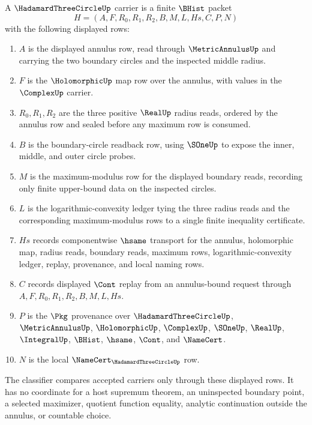 \begin{definition}
\label{def:hadamard-three-circle-carrier}
A $\HadamardThreeCircleUp$ carrier is a finite $\BHist$ packet
$$
H=(A,F,R_0,R_1,R_2,B,M,L,Hs,C,P,N)
$$
with the following displayed rows:
\begin{enumerate}
\item $A$ is the displayed annulus row, read through $\MetricAnnulusUp$ and carrying the two boundary circles and the inspected middle radius.
\item $F$ is the $\HolomorphicUp$ map row over the annulus, with values in the $\ComplexUp$ carrier.
\item $R_0,R_1,R_2$ are the three positive $\RealUp$ radius reads, ordered by the annulus row and sealed before any maximum row is consumed.
\item $B$ is the boundary-circle readback row, using $\SOneUp$ to expose the inner, middle, and outer circle probes.
\item $M$ is the maximum-modulus row for the displayed boundary reads, recording only finite upper-bound data on the inspected circles.
\item $L$ is the logarithmic-convexity ledger tying the three radius reads and the corresponding maximum-modulus rows to a single finite inequality certificate.
\item $Hs$ records componentwise $\hsame$ transport for the annulus, holomorphic map, radius reads, boundary reads, maximum rows, logarithmic-convexity ledger, replay, provenance, and local naming rows.
\item $C$ records displayed $\Cont$ replay from an annulus-bound request through $A,F,R_0,R_1,R_2,B,M,L,Hs$.
\item $P$ is the $\Pkg$ provenance over $\HadamardThreeCircleUp$, $\MetricAnnulusUp$, $\HolomorphicUp$, $\ComplexUp$, $\SOneUp$, $\RealUp$, $\IntegralUp$, $\BHist$, $\hsame$, $\Cont$, and $\NameCert$.
\item $N$ is the local $\NameCert_{\HadamardThreeCircleUp}$ row.
\end{enumerate}
The classifier compares accepted carriers only through these displayed rows. It has no coordinate for a host supremum theorem, an uninspected boundary point, a selected maximizer, quotient function equality, analytic continuation outside the annulus, or countable choice.
\end{definition}

